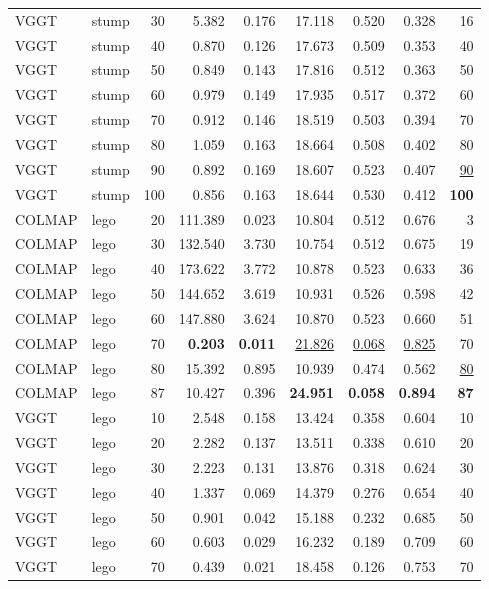 \begin{table}[H]
\begin{tabular}{llrrrrrrr}
VGGT & stump & 30 & 5.382 & 0.176 & 17.118 & 0.520 & 0.328 & 16 \\
VGGT & stump & 40 & 0.870 & 0.126 & 17.673 & 0.509 & 0.353 & 40 \\
VGGT & stump & 50 & 0.849 & 0.143 & 17.816 & 0.512 & 0.363 & 50 \\
VGGT & stump & 60 & 0.979 & 0.149 & 17.935 & 0.517 & 0.372 & 60 \\
VGGT & stump & 70 & 0.912 & 0.146 & 18.519 & 0.503 & 0.394 & 70 \\
VGGT & stump & 80 & 1.059 & 0.163 & 18.664 & 0.508 & 0.402 & 80 \\
VGGT & stump & 90 & 0.892 & 0.169 & 18.607 & 0.523 & 0.407 & \underline{90} \\
VGGT & stump & 100 & 0.856 & 0.163 & 18.644 & 0.530 & 0.412 & \textbf{100} \\
\midrule
COLMAP & lego & 20 & 111.389 & 0.023 & 10.804 & 0.512 & 0.676 & 3 \\
COLMAP & lego & 30 & 132.540 & 3.730 & 10.754 & 0.512 & 0.675 & 19 \\
COLMAP & lego & 40 & 173.622 & 3.772 & 10.878 & 0.523 & 0.633 & 36 \\
COLMAP & lego & 50 & 144.652 & 3.619 & 10.931 & 0.526 & 0.598 & 42 \\
COLMAP & lego & 60 & 147.880 & 3.624 & 10.870 & 0.523 & 0.660 & 51 \\
COLMAP & lego & 70 & \textbf{0.203} & \textbf{0.011} & \underline{21.826} & \underline{0.068} & \underline{0.825} & 70 \\
COLMAP & lego & 80 & 15.392 & 0.895 & 10.939 & 0.474 & 0.562 & \underline{80} \\
COLMAP & lego & 87 & 10.427 & 0.396 & \textbf{24.951} & \textbf{0.058} & \textbf{0.894} & \textbf{87} \\
VGGT & lego & 10 & 2.548 & 0.158 & 13.424 & 0.358 & 0.604 & 10 \\
VGGT & lego & 20 & 2.282 & 0.137 & 13.511 & 0.338 & 0.610 & 20 \\
VGGT & lego & 30 & 2.223 & 0.131 & 13.876 & 0.318 & 0.624 & 30 \\
VGGT & lego & 40 & 1.337 & 0.069 & 14.379 & 0.276 & 0.654 & 40 \\
VGGT & lego & 50 & 0.901 & 0.042 & 15.188 & 0.232 & 0.685 & 50 \\
VGGT & lego & 60 & 0.603 & 0.029 & 16.232 & 0.189 & 0.709 & 60 \\
VGGT & lego & 70 & 0.439 & 0.021 & 18.458 & 0.126 & 0.753 & 70 \\

\end{tabular}
\end{table}
